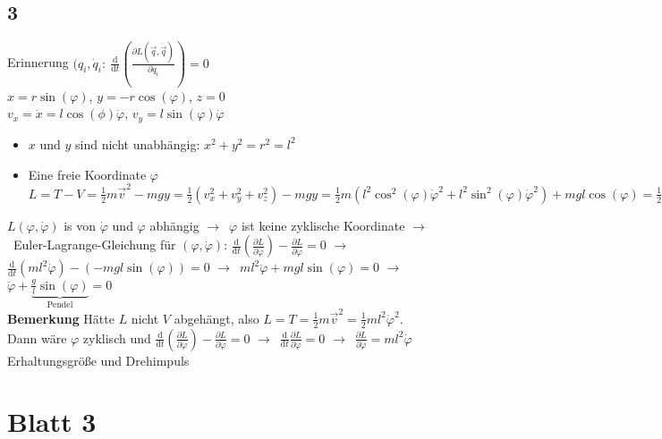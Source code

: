 \documentclass[oneside]{book}
\theoremstyle{definition}
\newcommand{\conseq}{$\rightarrow$~}
\renewcommand{\d}{\mathrm d}
\newcommand{\dd}[1]{\frac{\d}{\d #1}}
\newcommand{\ffpartial}[2]{\frac{\partial #1}{\partial #2}}
\newcommand{\dotvec}[1]{\dot{\vec{#1}}}
\begin{document}
\subsection{3}
Erinnerung $(q_i, \dot{q}_i:~ \dd t (\ffpartial{L(\vec{q}, \dotvec{q})}{\dot{q}_i}) = 0$\\
$x = r \sin(\varphi)$, $y = - r \cos(\varphi)$, $z = 0$\\
$v_x = \dot{x} = l \cos(\phi) \dot{\varphi}$, $v_y = l \sin(\varphi) \dot{\varphi}$ 
\begin{itemize}
	\item $x$ und $y$ sind nicht unabhängig: $x^2 + y^2 = r^2 = l^2$
	\item Eine freie Koordinate $\varphi$ $L = T - V = \frac12 m\vec{v}^2 - mg y = \frac12 (v_x^2 + v_y^2 + v_z^2) - mgy = \frac12 m (l^2 \cos^2(\varphi) \dot{\varphi}^2 + l^2 \sin^2(\varphi)\dot{\varphi}^2) + mgl \cos(\varphi) = \frac12 m l^2 \dot{\varphi}^2  + mgl \cos(\varphi) = L(\varphi, \dot{\varphi})$
\end{itemize}
$L(\varphi, \dot{\varphi})$ is von $\dot{\varphi}$ und $\varphi$ abhängig \conseq $\varphi$ ist keine zyklische Koordinate \conseq Euler-Lagrange-Gleichung für $(\varphi, \dot{\varphi})$: $\dd t (\ffpartial{L}{\dot{\varphi}}) - \ffpartial{L}{\varphi} = 0$ \conseq $\dd t (ml^2 \dot{\varphi}) - (-mgl \sin(\varphi)) = 0$ \conseq $ml^2 \ddot{\varphi} + mgl\sin(\varphi) = 0$ \conseq $\ddot{\varphi} + \underbrace{\frac{g}{l} \sin(\varphi)}_\text{Pendel} = 0$\\
\textbf{Bemerkung} Hätte $L$ nicht $V$ abgehängt, also $L = T = \frac12 m \vec{v}^2 = \frac12 m l^2 \dot{\varphi}^2$.\\
Dann wäre $\varphi$ zyklisch und $\dd t (\ffpartial{L}{\dot{\varphi}}) - \ffpartial{L}{\varphi} = 0$ \conseq $\dd t \ffpartial{L}{\dot{\varphi}} = 0$ \conseq $\ffpartial{L}{\dot{\varphi}} = m l^2 \dot{\varphi}$ Erhaltungsgröße und Drehimpuls

\section{Blatt 3}
\end{document}
